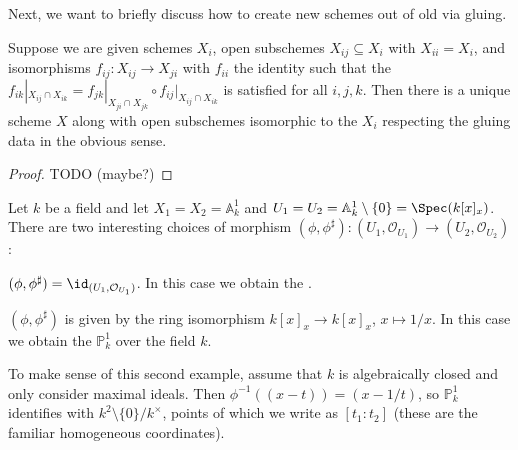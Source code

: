 \documentclass[wip, algebra]{bsteffan-lecturenotes}
\newcommand{\cO}{\mathcal{O}}
\newcommand{\A}{\mathbb{A}}
\renewcommand{\P}{\mathbb{P}}
\begin{document}
Next, we want to briefly discuss how to create new schemes out of old via gluing.
\begin{proposition}
	Suppose we are given schemes $X_i$, open subschemes $X_{ij} \subseteq X_i$ with $X_{ii} = X_i$, and isomorphisms $f_{ij}\colon X_{ij} \to X_{ji}$ with $f_{ii}$ the identity such that the  $f_{ik}|_{X_{ij} \cap X_{ik}} = f_{jk}|_{X_{ji} \cap X_{jk}} \circ f_{ij}|_{X_{ij} \cap X_{ik}}$ is satisfied for all $i, j, k$.
	Then there is a unique scheme $X$ along with open subschemes isomorphic to the $X_i$ respecting the gluing data in the obvious sense.
\end{proposition}
\begin{proof}
	TODO (maybe?)
\end{proof}
\begin{example}
	Let $k$ be a field and let $X_1 = X_2 = \A^1_k$ and $U_1 = U_2 = \A^1_k \setminus \{0\} = \Spec(k[x]_x)$. 
	There are two interesting choices of morphism $(\phi, \phi^\sharp)\colon (U_1, \cO_{U_1}) \to (U_2, \cO_{U_2})$:
	\begin{alphanumerate}
		\item $(\phi, \phi^\sharp) = \id_{(U_1, \cO_{U_1})}$.
			In this case we obtain the .
		\item $(\phi, \phi^\sharp)$ is given by the ring isomorphism $k[x]_x \to k[x]_x$, $x \mapsto 1 / x$.
			In this case we obtain the  $\P^1_k$ over the field $k$.
	\end{alphanumerate}
\end{example}
To make sense of this second example, assume that $k$ is algebraically closed and only consider maximal ideals.
Then $\phi^{-1}((x - t)) = (x - 1 / t)$, so $\P^1_k$ identifies with $k^2 \setminus \{0\} / k^\times$, points of which we write as $[t_1 : t_2]$ (these are the familiar homogeneous coordinates).
\end{document}
